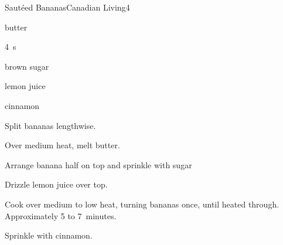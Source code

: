 \begin{recipe}{Saut\'{e}ed Bananas}{Canadian Living}{4}

\begin{ingredients}
\item {} butter
\item 4~s
\item \C{\quarter} brown sugar
\item {} lemon juice
\item cinnamon
\end{ingredients}

\begin{directions}
\item Split bananas lengthwise.
\item Over medium heat, melt butter.
\item Arrange banana half on top and sprinkle with sugar
\item Drizzle lemon juice over top.
\item Cook over medium to low heat, turning bananas once, until heated through. Approximately 5 to 7~minutes.
\item Sprinkle with cinnamon.
\end{directions}


\end{recipe}

